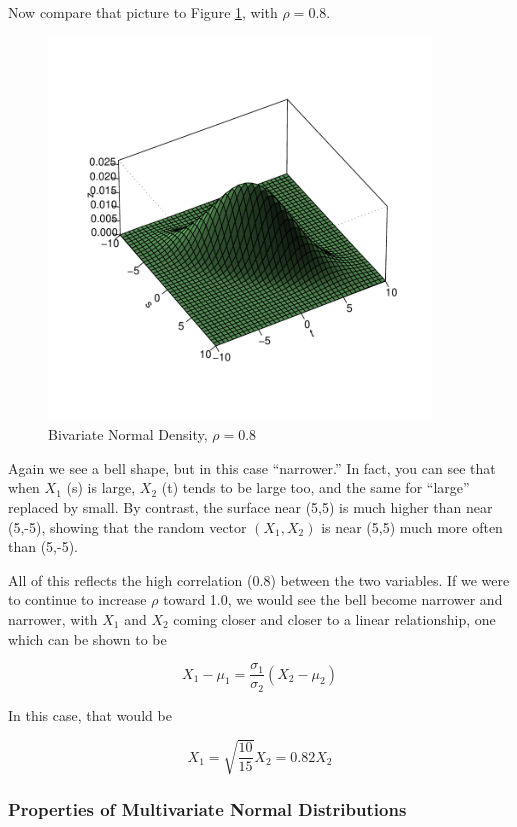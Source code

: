 Now compare that picture to Figure \ref{rho8}, with $\rho = 0.8$.

\begin{figure}
\centerline{
\includegraphics[width=4in]{Rho8.pdf}
}
\caption{Bivariate Normal Density, $\rho=0.8$}
\label{rho8}
\end{figure}

Again we see a bell shape, but in this case ``narrower.''  In fact, you
can see that when $X_1$ (s) is large, $X_2$ (t) tends to be large too,
and the same for ``large'' replaced by small.  By contrast, the surface
near (5,5) is much higher than near (5,-5), showing that the random
vector $(X_1, X_2)$ is near (5,5) much more often than (5,-5).

All of this reflects the high correlation (0.8) between the two variables.
If we were to continue to increase $\rho$ toward 1.0, we would see the
bell become narrower and narrower, with $X_1$ and $X_2$ coming closer
and closer to a linear relationship, one which can be shown to be

\begin{equation}
X_1 - \mu_1 = \frac{\sigma_1}{\sigma_2} (X_2 - \mu_2)
\end{equation}

In this case, that would be

\begin{equation}
X_1 = \sqrt{\frac{10}{15}} X_2 = 0.82 X_2
\end{equation}

\subsubsection{Properties of Multivariate Normal Distributions}
\label{mvnormproperties}

